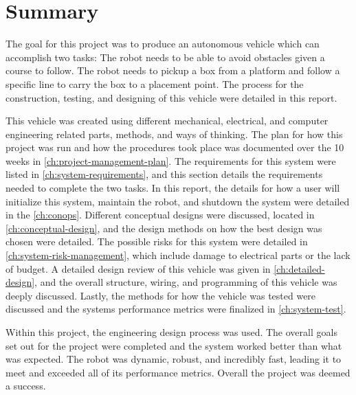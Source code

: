 \documentclass[11pt]{report}
\begin{document}
\chapter{Summary}\label{ch:summary}
The goal for this project was to produce an autonomous vehicle which can accomplish two tasks: The robot needs to be able to avoid obstacles given a course to follow. The robot needs to pickup a box from a platform and follow a specific line to carry the box to a placement point. The process for the construction, testing, and designing of this vehicle were detailed in this report. 
\par This vehicle was created using different mechanical, electrical, and computer engineering related parts, methods, and ways of thinking. The plan for how this project was run and how the procedures took place was documented over the 10 weeks in \cref{ch:project-management-plan}. The requirements for this system were listed in \cref{ch:system-requirements}, and this section details the requirements needed to complete the two tasks. In this report, the details for how a user will initialize this system, maintain the robot, and shutdown the system were detailed in the \cref{ch:conops}. Different conceptual designs were discussed, located in \cref{ch:conceptual-design}, and the design methods on how the best design was chosen were detailed. The possible risks for this system were detailed in \cref{ch:system-risk-management}, which include damage to electrical parts or the lack of budget. A detailed design review of this vehicle was given in \cref{ch:detailed-design}, and the overall structure, wiring, and programming of this vehicle was deeply discussed. Lastly, the methods for how the vehicle was tested were discussed and the systems performance metrics were finalized in \cref{ch:system-test}. 

\par Within this project, the engineering design process was used. The overall goals set out for the project were completed and the system worked better than what was expected. The robot was dynamic, robust, and incredibly fast, leading it to meet and exceeded all of its performance metrics. Overall the project was deemed a success. 
\end{document}
